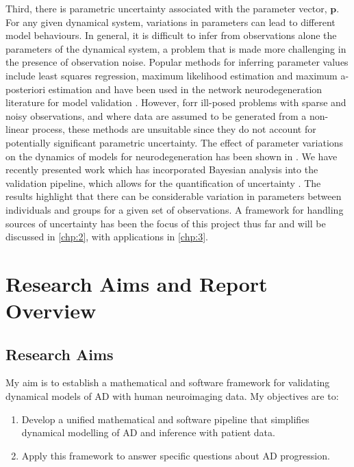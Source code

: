Third, there is parametric uncertainty associated with the parameter vector,
$\mathbf{p}$. For any given dynamical system, variations in parameters can lead
to different model behaviours. In general, it is difficult to infer from
observations alone the parameters of the dynamical system, a problem that is
made more challenging in the presence of observation noise. Popular methods for
inferring parameter values include least squares regression, maximum likelihood
estimation and maximum a-posteriori estimation and have been used in the network
neurodegeneration literature for model validation
\cite{raj2012network,raj2015network,vogel2020spread}. However, forr ill-posed
problems with sparse and noisy observations, and where data are assumed to be
generated from a non-linear process, these methods are unsuitable since they do
not account for potentially significant parametric uncertainty. The effect of
parameter variations on the dynamics of models for neurodegeneration has been
shown in \cite{putra2021braiding}. We have recently presented work which has
incorporated Bayesian analysis into the validation pipeline, which allows for
the quantification of uncertainty
\cite{schafer2020network,schafer2021bayesian,schafer2022correlating}. The
results highlight that there can be considerable variation in parameters between
individuals and groups for a given set of observations. A framework for handling
sources of uncertainty has been the focus of this project thus far and will be
discussed in \cref{chp:2}, with applications in \cref{chp:3}. 

\section{Research Aims and Report Overview}

\subsection{Research Aims}
My aim is to establish a mathematical and software framework for validating
dynamical models of AD with human neuroimaging data. My objectives are to: 

\begin{enumerate} 
    \item Develop a unified mathematical and software pipeline that
    simplifies dynamical modelling of AD and inference with patient data. 
    \item Apply this framework to answer specific questions about AD
    progression.
\end{enumerate}

